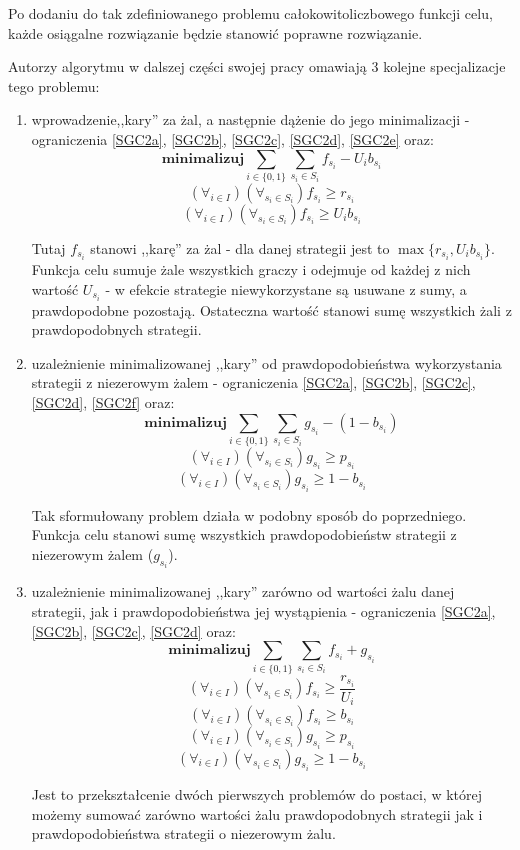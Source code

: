 \documentclass[polish]{standalone}
\begin{document}
Po dodaniu do tak zdefiniowanego problemu całokowitoliczbowego funkcji celu, każde osiągalne rozwiązanie będzie stanowić
poprawne rozwiązanie. \cite[str.~2]{SCG-NE}

Autorzy algorytmu w dalszej części swojej pracy omawiają 3 kolejne specjalizacje tego problemu:
\begin{enumerate}
\item wprowadzenie,,kary'' za żal, a następnie dążenie do jego minimalizacji - ograniczenia \ref{SGC2a},
\ref{SGC2b}, \ref{SGC2c}, \ref{SGC2d}, \ref{SGC2e} oraz:
$$\textbf{minimalizuj} \sum_{i \in \{0,1\}} \sum_{s_i \in S_i} f_{s_i} - U_i b_{s_i}$$
$$(\forall_{i \in I}) (\forall_{s_i \in S_i}) f_{s_i} \geq r_{s_i}$$
$$(\forall_{i \in I}) (\forall_{s_i \in S_i}) f_{s_i} \geq U_i b_{s_i}$$
\cite[str.~2]{SCG-NE}

Tutaj $f_{s_i}$ stanowi ,,karę'' za żal - dla danej strategii jest to $\max \{ r_{s_i}, U_i b_{s_i} \}$. Funkcja celu
sumuje żale wszystkich graczy i odejmuje od każdej z nich wartość $U_{s_i}$ - w efekcie strategie niewykorzystane są
usuwane z sumy, a prawdopodobne pozostają. Ostateczna wartość stanowi sumę wszystkich żali z prawdopodobnych strategii.

\item uzależnienie minimalizowanej ,,kary'' od prawdopodobieństwa wykorzystania strategii z niezerowym żalem
- ograniczenia \ref{SGC2a}, \ref{SGC2b}, \ref{SGC2c}, \ref{SGC2d}, \ref{SGC2f} oraz:
$$\textbf{minimalizuj} \sum_{i \in \{0,1\}} \sum_{s_i \in S_i} g_{s_i} - (1 - b_{s_i})$$
$$(\forall_{i \in I}) (\forall_{s_i \in S_i}) g_{s_i} \geq p_{s_i}$$
$$(\forall_{i \in I}) (\forall_{s_i \in S_i}) g_{s_i} \geq 1 - b_{s_i}$$
\cite[str.~2]{SCG-NE}

Tak sformułowany problem działa w podobny sposób do poprzedniego. Funkcja celu stanowi sumę wszystkich
prawdopodobieństw strategii z niezerowym żalem ($g_{s_i}$).

\item uzależnienie minimalizowanej ,,kary'' zarówno od wartości żalu danej strategii, jak i prawdopodobieństwa jej
wystąpienia - ograniczenia \ref{SGC2a}, \ref{SGC2b}, \ref{SGC2c}, \ref{SGC2d} oraz:
$$\textbf{minimalizuj} \sum_{i \in \{0,1\}} \sum_{s_i \in S_i} f_{s_i} + g_{s_i}$$
$$(\forall_{i \in I}) (\forall_{s_i \in S_i}) f_{s_i} \geq \frac{r_{s_i}}{U_i}$$
$$(\forall_{i \in I}) (\forall_{s_i \in S_i}) f_{s_i} \geq b_{s_i}$$
$$(\forall_{i \in I}) (\forall_{s_i \in S_i}) g_{s_i} \geq p_{s_i}$$
$$(\forall_{i \in I}) (\forall_{s_i \in S_i}) g_{s_i} \geq 1 - b_{s_i}$$
\cite[str.~2--3]{SCG-NE}

Jest to przekształcenie dwóch pierwszych problemów do postaci, w której możemy sumować zarówno wartości żalu
prawdopodobnych strategii jak i prawdopodobieństwa strategii o niezerowym żalu.
\end{enumerate}
\end{document}
